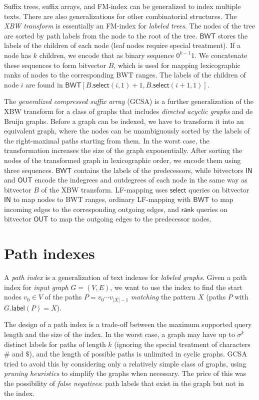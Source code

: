 \documentclass[a4paper,UKenglish]{lipics-v2016}
\newcommand{\abs}[1]{\ensuremath{\lvert #1 \rvert}}
\newcommand{\rank}{\ensuremath{\mathsf{rank}}}
\newcommand{\select}{\ensuremath{\mathsf{select}}}
\newcommand{\glabel}{\ensuremath{\mathsf{label}}}
\newcommand{\LFmapping}{LF\nobreakdash-mapping}
\newcommand{\FMindex}{FM\nobreakdash-index}
\newcommand{\BWT}{\ensuremath{\mathsf{BWT}}}
\newcommand{\bvIN}{\ensuremath{\mathsf{IN}}}
\newcommand{\bvOUT}{\ensuremath{\mathsf{OUT}}}
\begin{document}
Suffix trees, suffix arrays, and \FMindex{} can be generalized to index multiple texts. There are also generalizations for other combinatorial structures. The \emph{XBW transform} \cite{Ferragina2009b} is essentially an \FMindex{} for \emph{labeled trees}. The nodes of the tree are sorted by path labels from the node to the root of the tree. $\BWT$ stores the labels of the children of each node (leaf nodes require special treatment). If a node has $k$ children, we encode that as binary sequence $0^{k-1} 1$. We concatenate these sequences to form bitvector $B$, which is used for mapping lexicographic ranks of nodes to the corresponding BWT ranges. The labels of the children of node $i$ are found in $\BWT[B.\select(i, 1) + 1, B.\select(i + 1, 1)]$.

The \emph{generalized compressed suffix array} (GCSA) \cite{Siren2014} is a further generalization of the XBW transform for a class of graphs that includes \emph{directed acyclic graphs} and de Bruijn graphs. Before a graph can be indexed, we have to transform it into an equivalent graph, where the nodes can be unambiguously sorted by the labels of the right-maximal paths starting from them. In the worst case, the transformation increases the size of the graph exponentially. After sorting the nodes of the transformed graph in lexicographic order, we encode them using three sequences. $\BWT$ contains the labels of the predecessors, while bitvectors $\bvIN$ and $\bvOUT$ encode the indegrees and outdegrees of each node in the same way as bitvector $B$ of the XBW transform. \LFmapping{} uses $\select$ queries on bitvector $\bvIN$ to map nodes to BWT ranges, ordinary \LFmapping{} with $\BWT$ to map incoming edges to the corresponding outgoing edges, and $\rank$ queries on bitvector $\bvOUT$ to map the outgoing edges to the predecessor nodes.


\section{Path indexes}\label{sect:path-indexes}

A \emph{path index} is a generalization of text indexes for \emph{labeled graphs}. Given a path index for \emph{input graph} $G = (V, E)$, we want to use the index to find the start nodes $v_{0} \in V$ of the paths $P = v_{0} \dotsm v_{\abs{X}-1}$ \emph{matching} the pattern $X$ (paths $P$ with $G.\glabel(P) = X$).

The design of a path index is a trade-off between the maximum supported query length and the size of the index. In the worst case, a graph may have up to $\sigma^{k}$ distinct labels for paths of length $k$ (ignoring the special treatment of characters $\#$ and $\$$), and the length of possible paths is unlimited in cyclic graphs. GCSA \cite{Siren2014} tried to avoid this by considering only a relatively simple class of graphs, using \emph{pruning heuristics} to simplify the graphs when necessary. The price of this was the possibility of \emph{false negatives}: path labels that exist in the graph but not in the index.
\end{document}
